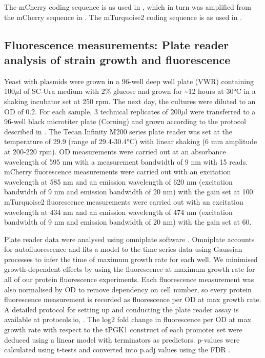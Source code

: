 \documentclass[../main.tex]{subfiles}
\begin{document}
The mCherry coding sequence is as used in \parencite{Garcia2018}, which in turn was amplified from the mCherry sequence in \parencite{Sharon2012}.
The mTurquoise2 coding sequence is as used in \parencite{Lee2015}.


\subsection{Fluorescence measurements: Plate reader analysis of strain growth and fluorescence}

Yeast with plasmids were grown in a 96-well deep well plate (VWR) containing 100\(\mu\)l of SC-Ura medium with 2\% glucose and grown for \textasciitilde12 hours at 30°C in a shaking incubator set at 250 rpm.
The next day, the cultures were diluted to an OD of 0.2. For each sample, 3 technical replicates of 200\(\mu\)l were transferred to a 96-well black microtiter plate (Corning) and grown according to the protocol described in \parencite{Lichten2014}.
The Tecan Infinity M200 series plate reader was set at the temperature of 29.9 (range of 29.4-30.4°C) with linear shaking (6 mm amplitude at 200-220 rpm).
OD measurements were carried out at an absorbance wavelength of 595 nm with a measurement bandwidth of 9 nm with 15 reads. mCherry fluorescence measurements were carried out with an excitation wavelength at 585 nm and an emission wavelength of 620 nm (excitation bandwidth of 9 nm and emission bandwidth of 20 nm) with the gain set at 100.
mTurquoise2 fluorescence measurements were carried out with an excitation wavelength at 434 nm and an emission wavelength of 474 nm (excitation bandwidth of 9 nm and emission bandwidth of 20 nm) with the gain set at 60.

Plate reader data were analysed using omniplate software \parencite{Swain2016}.
Omniplate accounts for autofluorescence and fits a model to the time series data using Gaussian processes to infer the time of maximum growth rate for each well.
We minimised growth-dependent effects by using the fluorescence at maximum growth rate for all of our protein fluorescence experiments.
Each fluorescence measurement was also normalised by OD to remove dependency on cell number, so every protein fluorescence measurement is recorded as fluorescence per OD at max growth rate.
A detailed protocol for setting up and conducting the plate reader assay is available at protocols.io, .
The log2 fold change in fluorescence per OD at max growth rate with respect to the tPGK1 construct of each promoter set were deduced using a linear model with terminators as predictors. 
p-values were calculated using t-tests and converted into p.adj values using the FDR \parencite{Benjamini1995}.
\end{document}
